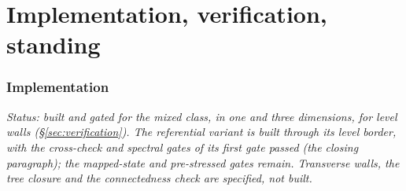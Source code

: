 \documentclass[11pt]{article}
\theoremstyle{definition}
\theoremstyle{remark}
\begin{document}
\part{Implementation, verification, standing}

\section{Implementation}
\label{sec:implementation}
\label{sec:impl}

\emph{Status: built and gated for the mixed class, in one and three
dimensions, for level walls (\S\ref{sec:verification}). The
referential variant is built through its level border, with the
cross-check and spectral gates of its first gate passed (the closing
paragraph); the mapped-state and pre-stressed gates remain. Transverse
walls, the tree closure and the connectedness check are specified, not
built.}
\end{document}
